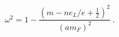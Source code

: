 \begin{equation}
\omega^2=1- \frac{(m-ne_L/e+\frac{1}{2})^2}{(am_F)^2} ~.
\label{root}
\end{equation}

